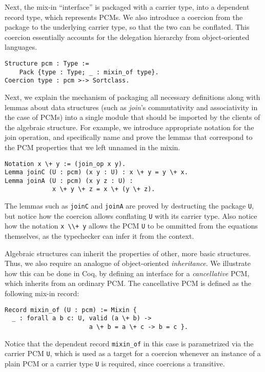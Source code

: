 \documentclass[blockstyle,preprint]{sigplanconf}
\newcommand{\is}[1]{\textcolor{blue}{(Ilya: {#1})}}
\newcommand{\an}[1]{\textcolor{red}{(Aleks: {#1})}}
\newcommand{\code}[1]{\lstinline{#1}}
\begin{document}
Next, the mix-in ``interface'' is packaged with a carrier type, into a
dependent record type, which represents PCMs. We also introduce a
coercion from the package to the underlying carrier type, so that the
two can be conflated. This coercion essentially accounts for the
delegation hierarchy from object-oriented languages.
%
%
\begin{lstlisting}
Structure pcm : Type := 
    Pack {type : Type; _ : mixin_of type}.
Coercion type : pcm >-> Sortclass.
\end{lstlisting}
%
Next, we explain the mechanism of packaging all necessary definitions
along with lemmas about data structures (such as \emph{join}'s
commutativity and associativity in the case of PCMs) into a single
module that should be imported by the clients of the algebraic
structure.  For example, we introduce appropriate notation for the
join operation, and specifically name and prove the lemmas that
correspond to the PCM properties that we left unnamed in the mixin.
\begin{lstlisting}
Notation x \+ y := (join_op x y).
Lemma joinC (U : pcm) (x y : U) : x \+ y = y \+ x.
Lemma joinA (U : pcm) (x y z : U) : 
             x \+ y \+ z = x \+ (y \+ z).
\end{lstlisting}
The lemmas such as \code{joinC} and \code{joinA} are proved by
destructing the package \code{U}, but notice how the coercion allows
conflating \code{U} with its carrier type. Also notice how the
notation \code{x \\+ y} allows the PCM \code{U} to be ommitted from
the equations themselves, as the typechecker can infer it from the
context.

Algebraic structures can inherit the properties of other, more basic
structures. Thus, we also require an analogue of object-oriented
\emph{inheritance}. We illustrate how this can be done in Coq, by
defining an interface for a \emph{cancellative} PCM, which inherits
from an ordinary PCM. The cancellative PCM is defined as the following
mix-in record:
%
\begin{lstlisting}
Record mixin_of (U : pcm) := Mixin {
  _ : forall a b c: U, valid (a \+ b) -> 
                       a \+ b = a \+ c -> b = c }.
\end{lstlisting}
%
Notice that the dependent record \code{mixin_of} in this case is
parametrized via the carrier PCM \code{U}, which is used as a target
for a coercion whenever an instance of a plain PCM or a carrier type
\code{U} is required, since coercions a transitive.
%
%
%
\end{document}
